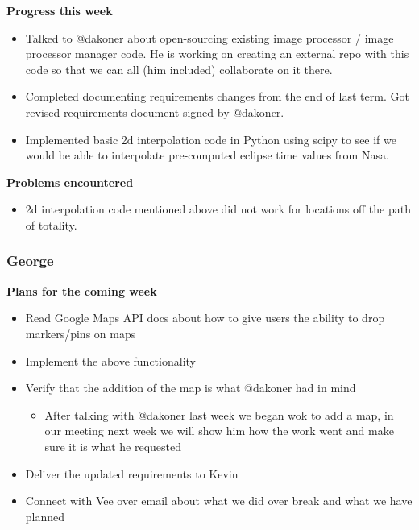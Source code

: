\documentclass[10pt, onecolumn, draftclsnofoot, letterpaper, compsoc]{IEEEtran}
\begin{document}
    \noindent \textbf{Progress this week}

    \begin{itemize}

    \item Talked to @dakoner about open-sourcing existing image processor / image processor manager code. He is
      working on creating an external repo with this code so that we can all (him included) collaborate on it there.
    \item Completed documenting requirements changes from the end of last term. Got revised requirements document signed
      by @dakoner.
    \item Implemented basic 2d interpolation code in Python using scipy to see if we would be able to interpolate
      pre-computed eclipse time values from Nasa.

    \end{itemize}

    \noindent \textbf{Problems encountered}

    \begin{itemize}

    \item 2d interpolation code mentioned above did not work for locations off the path of totality.

    \end{itemize}

    \subsubsection{George}

    \noindent \textbf{Plans for the coming week}

    \begin{itemize}

    \item Read Google Maps API docs about how to give users the ability to drop markers/pins on maps
    \item Implement the above functionality
    \item Verify that the addition of the map is what @dakoner had in mind

        \begin{itemize}
            \item After talking with @dakoner last week we began wok to add a map, in our meeting next week we will show him how
            the work went and make sure it is what he requested
        \end{itemize}

    \item Deliver the updated requirements to Kevin
    \item Connect with Vee over email about what we did over break and what we have planned

    \end{itemize}
\end{document}
